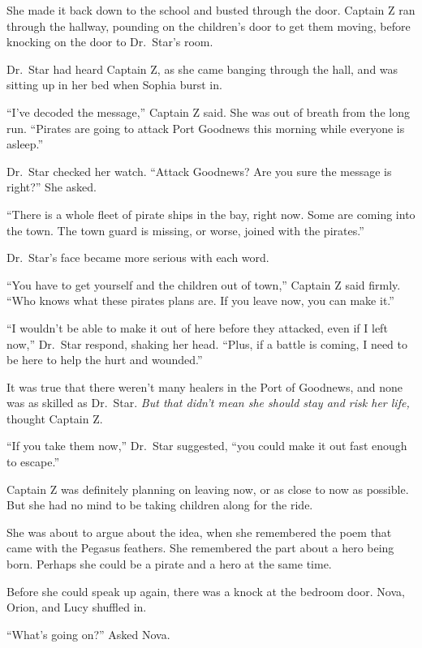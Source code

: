 \documentclass[12pt]{extbook}
\begin{document}
  She made it back down to the school and busted through the door. Captain
  Z ran through the hallway, pounding on the children's door to get them
  moving, before knocking on the door to Dr.~Star's room.
  
  Dr.~Star had heard Captain Z, as she came banging through the hall, and
  was sitting up in her bed when Sophia burst in.
  
  \enquote{I've decoded the message,} Captain Z said. She was out of
  breath from the long run. \enquote{Pirates are going to attack Port
  Goodnews this morning while everyone is asleep.}
  
  Dr.~Star checked her watch. \enquote{Attack Goodnews? Are you sure the
  message is right?} She asked.
  
  \enquote{There is a whole fleet of pirate ships in the bay, right now.
  Some are coming into the town. The town guard is missing, or worse,
  joined with the pirates.}
  
  Dr.~Star's face became more serious with each word.
  
  \enquote{You have to get yourself and the children out of town,} Captain
  Z said firmly. \enquote{Who knows what these pirates plans are. If you
  leave now, you can make it.}
  
  \enquote{I wouldn't be able to make it out of here before they attacked,
  even if I left now,} Dr.~Star respond, shaking her head. \enquote{Plus,
  if a battle is coming, I need to be here to help the hurt and wounded.}
  
  It was true that there weren't many healers in the Port of Goodnews, and
  none was as skilled as Dr.~Star. \emph{But that didn't mean she should
  stay and risk her life,} thought Captain Z.
  
  \enquote{If you take them now,} Dr.~Star suggested, \enquote{you could
  make it out fast enough to escape.}
  
  Captain Z was definitely planning on leaving now, or as close to now as
  possible. But she had no mind to be taking children along for the ride.
  
  She was about to argue about the idea, when she remembered the poem that
  came with the Pegasus feathers. She remembered the part about a hero
  being born. Perhaps she could be a pirate and a hero at the same time.
  
  Before she could speak up again, there was a knock at the bedroom door.
  Nova, Orion, and Lucy shuffled in.
  
  \enquote{What's going on?} Asked Nova.
  
\end{document}
